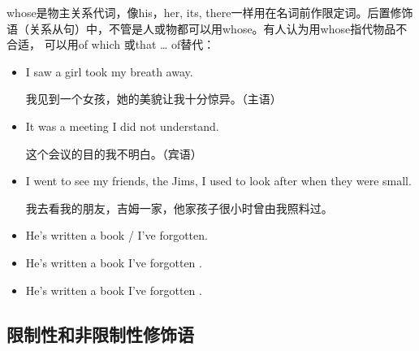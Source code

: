 whose是物主关系代词，像his，her, its, there一样用在名词前作限定词。后置修饰
语（关系从句）中，不管是人或物都可以用whose。有人认为用whose指代物品不合适，
可以用of which 或that \ldots{} of替代：
\begin{itemize}
\item I saw a girl  took my breath away.

  我见到一个女孩，她的美貌让我十分惊异。（主语）

\item It was a meeting  I did not understand.

  这个会议的目的我不明白。（宾语）


\item I went to see my friends, the Jims,  I used to
  look after when they were small.

  我去看我的朋友，吉姆一家，他家孩子很小时曾由我照料过。


\item He's written a book / I've forgotten.
\item He's written a book  I've forgotten .
\item He's written a book  I've forgotten .
\end{itemize}


\subsection{限制性和非限制性修饰语}

